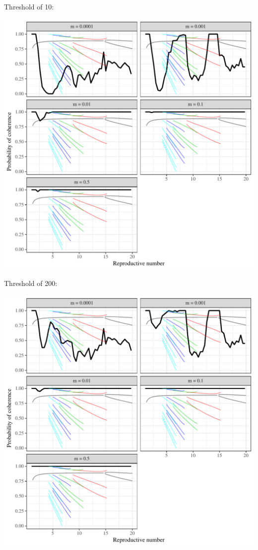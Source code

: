 \documentclass[12pt]{article}\usepackage[]{graphicx}\usepackage[]{color}
\makeatletter
\def\maxwidth{ %
  \ifdim\Gin@nat@width>\linewidth
    \linewidth
  \else
    \Gin@nat@width
  \fi
}
\newenvironment{knitrout}{}{} %
\makeatother
\begin{document}
Threshold of 10:

\begin{knitrout}
\color{fgcolor}
\includegraphics[width=\maxwidth]{figure/coherenceplot-5-1} 

\end{knitrout}

Threshold of 200:

\begin{knitrout}
\color{fgcolor}
\includegraphics[width=\maxwidth]{figure/coherenceplot-200-1} 

\end{knitrout}
\end{document}
